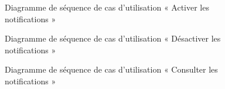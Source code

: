 \begin{figure}[H]
  \centering
  \caption{Diagramme de séquence de cas d'utilisation « Activer les notifications »}
  \label{fig:sequence_activate_notification}
\end{figure}

\begin{figure}[H]
  \centering
  \caption{Diagramme de séquence de cas d'utilisation « Désactiver les notifications »}
  \label{fig:sequence_deactivate_notification}
\end{figure}

\begin{figure}[H]
  \centering
  \caption{Diagramme de séquence de cas d'utilisation « Consulter les notifications »}
  \label{fig:sequence_lister_notification}
\end{figure}

